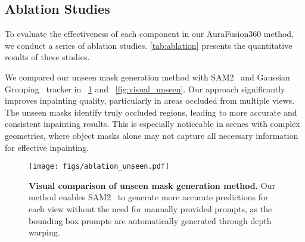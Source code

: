 \subsection{Ablation Studies}
To evaluate the effectiveness of each component in our AuraFusion360 method, we conduct a series of ablation studies. \cref{tab:ablation} presents the quantitative results of these studies. %


\vspace{3pt}
We compared our unseen mask generation method with SAM2~\cite{ravi2024sam2} and Gaussian Grouping~\cite{ye2023gaussian} tracker in ~\cref{fig:ablation_unseen} and ~\cref{fig:visual_unseen}. Our approach significantly improves inpainting quality, particularly in areas occluded from multiple views. The unseen masks identify truly occluded regions, leading to more accurate and consistent inpainting results. This is especially noticeable in scenes with complex geometries, where object masks alone may not capture all necessary information for effective inpainting.

\begin{figure}[t]
    \centering
    \texttt{[image: figs/ablation\_unseen.pdf]}
    \vspace{-6mm}
    \caption{\textbf{Visual comparison of unseen mask generation method.} Our method enables SAM2~\cite{ravi2024sam2} to generate more accurate predictions for each view without the need for manually provided prompts, as the bounding box prompts are automatically generated through depth warping.} %
    \label{fig:ablation_unseen}
\end{figure}

